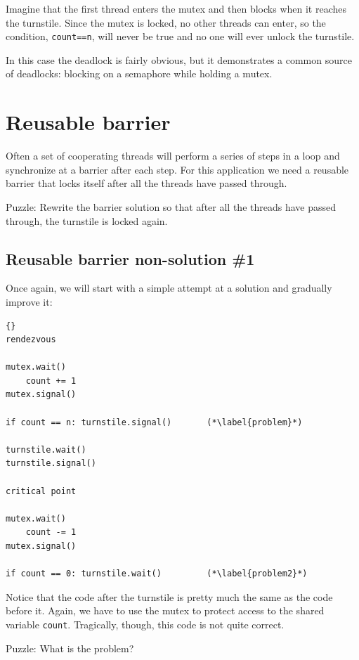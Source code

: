 \documentclass{book}
\newcommand{\clearemptydoublepage}{\newpage\cleardoublepage}
\begin{document}
Imagine that the first thread enters the
mutex and then blocks when it reaches the turnstile.
Since the mutex is locked, no other threads can enter,
so the condition, {\tt count==n}, will never be true and
no one will ever unlock the turnstile.

In this case the deadlock is fairly obvious, but it
demonstrates a
common source of deadlocks: blocking on a semaphore while
holding a mutex.


\section {Reusable barrier}
\label{rebar}

Often a set of cooperating threads will perform a series of steps
in a loop and synchronize at a barrier after each step.  For this
application we need a reusable barrier that locks itself after
all the threads have passed through.

Puzzle: Rewrite the barrier solution so that after all the threads
have passed through, the turnstile is locked again.


\clearemptydoublepage
\subsection {Reusable barrier non-solution \#1}

Once again, we will start with a simple attempt at a solution
and gradually improve it:

\begin{lstlisting}[caption={Reusable barrier non-solution}]{}
rendezvous

mutex.wait()
    count += 1
mutex.signal()

if count == n: turnstile.signal()       (*\label{problem}*)

turnstile.wait()
turnstile.signal()

critical point

mutex.wait()
    count -= 1
mutex.signal()

if count == 0: turnstile.wait()         (*\label{problem2}*)
\end{lstlisting}

Notice that the code after the turnstile is pretty much the same as
the code before it.  Again, we have to use the mutex to protect access
to the shared variable {\tt count}.
Tragically, though, this code is not quite correct.

Puzzle: What is the problem?
\end{document}
